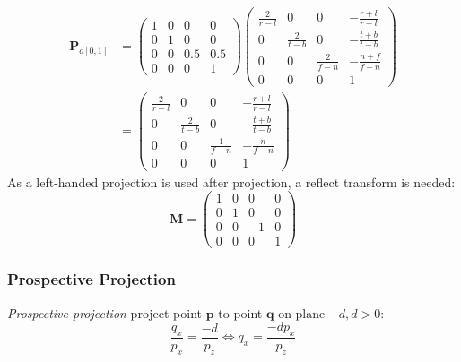 \documentclass[10pt, a4paper]{article}
\begin{document}
            \begin{align*}
                \textbf{P}_{o[0, 1]}
                &= 
                \begin{pmatrix}
                    1 & 0 & 0 & 0\\
                    0 & 1 & 0 & 0\\
                    0 & 0 & 0.5 & 0.5\\
                    0 & 0 & 0 & 1 
                \end{pmatrix}
                \begin{pmatrix}
                    \frac{2}{r - l} & 0 & 0 & -\frac{r + l}{r - l}\\
                    0 & \frac{2}{t - b} & 0 & -\frac{t + b}{t - b}\\
                    0 & 0 & \frac{2}{f - n} & -\frac{n + f}{f - n}\\
                    0 & 0 & 0 & 1
                \end{pmatrix}\\
                &=
                \begin{pmatrix}
                \frac{2}{r - l} & 0 & 0 & -\frac{r + l}{r - l}\\
                0 & \frac{2}{t - b} & 0 & -\frac{t + b}{t - b}\\
                0 & 0 & \frac{1}{f - n} & -\frac{n}{f - n}\\
                0 & 0 & 0 & 1
                \end{pmatrix}
            \end{align*}
            \indent As a left-handed projection is used after projection, a reflect transform is needed:\\
            \begin{equation*}
                \textbf{M} =
                \begin{pmatrix} 
                    1 & 0 & 0 & 0 \\
                    0 & 1 & 0 & 0 \\ 
                    0 & 0 & -1 & 0\\
                    0 & 0 & 0 & 1
                \end{pmatrix}
            \end{equation*}
        \newpage 

        \subsubsection{Prospective Projection}
            \emph{Prospective projection} project point $\textbf{p}$ to point $\textbf{q}$ on plane $-d, d > 0$:
                $$ \frac{q_x}{p_x} = \frac{-d}{p_z} \iff q_x = \frac{-dp_x}{p_z}$$
            
\end{document}

